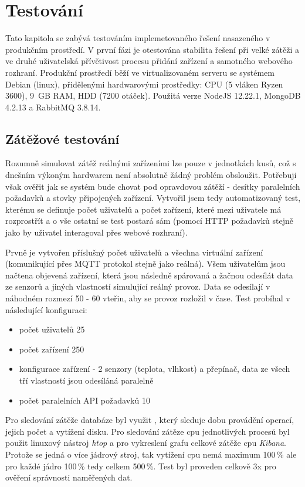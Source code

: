 \chapter{Testování}
Tato kapitola se zabývá testováním implemetovaného řešení nasazeného v produkčním prostředí. V první fázi je otestována stabilita řešení při velké zátěži a ve druhé uživatelská přívětivost procesu přidání zařízení a samotného webového rozhraní. Produkční prostředí běží ve virtualizovaném serveru se systémem Debian (linux), přidělenými hardwarovými prostředky: CPU (5 vláken Ryzen 3600), 9~GB RAM, HDD (7200 otáček). Použitá verze NodeJS 12.22.1, MongoDB 4.2.13 a RabbitMQ 3.8.14.

\section{Zátěžové testování}
Rozumně simulovat zátěž reálnými zařízeními lze pouze v jednotkách kusů, což s dnešním výkoným hardwarem není absolutně žádný problém obsloužit. Potřebuji však ověřit jak se systém bude chovat pod opravdovou zátěží - desítky paralelních požadavků a stovky připojených zařízení. Vytvořil jsem tedy automatizovaný test, kterému se definuje počet uživatelů a počet zařízení, které mezi uživatele má rozprostřít a o vše ostatní se test postará sám (pomocí HTTP požadavků stejně jako by uživatel interagoval přes webové rozhraní).

Prvně je vytvořen příslušný počet uživatelů a všechna virtuální zařízení (komunikující přes MQTT protokol stejně jako reálná). Všem uživatelům jsou načtena objevená zařízení, která jsou následně spárovaná a žačnou odesílát data ze senzorů a jiných vlastností simulující reálný provoz. Data se odesílají v náhodném rozmezí 50 - 60 vteřin, aby se provoz rozložil v čase. Test probíhal v následující konfiguraci:
\begin{itemize}
    \item počet uživatelů 25
    \item počet zařízení 250
    \item konfigurace zařízení - 2 senzory (teplota, vlhkost) a přepínač, data ze všech tří vlastností jsou odesíláná paralelně
    \item počet paralelních API požadavků 10
\end{itemize}
Pro sledování zátěže databáze byl využit  \cite{free-monitoring}, který sleduje dobu provádění operací, jejich počet a vytížení disku. Pro sledování zátěze cpu jednotlivých procesů byl použit linuxový nástroj \textit{htop} a pro vykreslení grafu celkové zátěže cpu \textit{Kibana}. Protože se jedná o více jádrový stroj, tak vytížení cpu nemá maximum 100\,\% ale pro každé jádro 100\,\% tedy celkem 500\,\%. Test byl proveden celkově 3x pro ověření správnosti naměřených dat.

